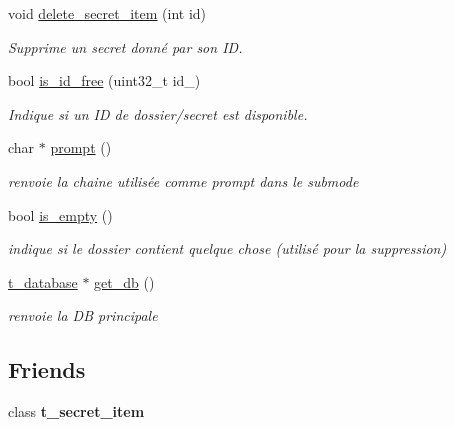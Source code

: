 \begin{DoxyCompactItemize}
\mbox{\label{classt__secret__folder_ad2dd73f36810dcb90851a18ddf767ba8}} 
void \hyperlink{classt__secret__folder_ad2dd73f36810dcb90851a18ddf767ba8}{delete\+\_\+secret\+\_\+item} (int id)
\begin{DoxyCompactList}\small\item\em Supprime un secret donné par son ID. \end{DoxyCompactList}\item 
bool \hyperlink{classt__secret__folder_a8bc4123040163d7d226025d85c46116b}{is\+\_\+id\+\_\+free} (uint32\+\_\+t id\+\_\+)
\begin{DoxyCompactList}\small\item\em Indique si un ID de dossier/secret est disponible. \end{DoxyCompactList}\item 
char $\ast$ \hyperlink{classt__secret__folder_a8bc7cf9c9c5abc10bded9c3d4c54da26}{prompt} ()
\begin{DoxyCompactList}\small\item\em renvoie la chaine utilisée comme prompt dans le submode \end{DoxyCompactList}\item 
\mbox{\label{classt__secret__folder_aa8ae7c1dfbb9e58eb42a666d9ab9fe5b}} 
bool \hyperlink{classt__secret__folder_aa8ae7c1dfbb9e58eb42a666d9ab9fe5b}{is\+\_\+empty} ()
\begin{DoxyCompactList}\small\item\em indique si le dossier contient quelque chose (utilisé pour la suppression) \end{DoxyCompactList}\item 
\mbox{\label{classt__secret__folder_a088be21b4506cad2fdb8a075e890ecc2}} 
\hyperlink{classt__database}{t\+\_\+database} $\ast$ \hyperlink{classt__secret__folder_a088be21b4506cad2fdb8a075e890ecc2}{get\+\_\+db} ()
\begin{DoxyCompactList}\small\item\em renvoie la DB principale \end{DoxyCompactList}\end{DoxyCompactItemize}
\subsection*{Friends}
\begin{DoxyCompactItemize}
\item 
\mbox{\label{classt__secret__folder_a6c3e7c3440436f1dbd7be59b54c36e3b}} 
class {\bfseries t\+\_\+secret\+\_\+item}
\end{DoxyCompactItemize}



